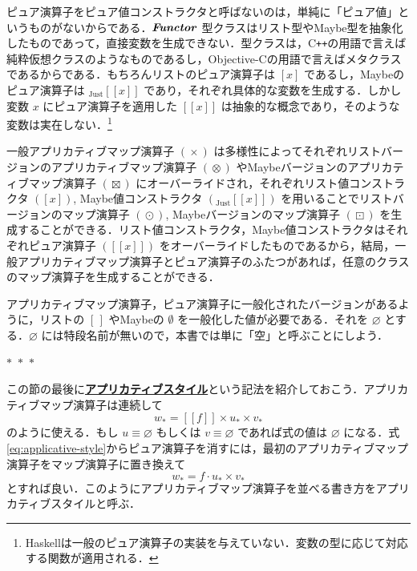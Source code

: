 \documentclass[a5paper,twoside,fleqn,draft]{jsbook}
\def\[{[\![}
\def\]{]\!]}
\newcommand{\separator}{\begin{center}$*$~$*$~$*$\end{center}}
\newcommand{\programminglanguage}[1]{\textsf{#1}}
\newcommand{\cxx}{\programminglanguage{C}\texttt{++}}
\newcommand{\haskell}{\programminglanguage{Haskell}}
\newcommand{\objectivec}{\programminglanguage{Objective-C}}
\newcommand{\keyword}[1]{{\underline{\textbf{#1}}}}
\newcommand{\mEmptyList}{{[\,]}}
\newcommand{\mNothing}{\emptyset}
\newcommand{\mPureNothing}{\varnothing}
\DeclareMathOperator{\mAppMap}{\times}
\DeclareMathOperator{\mAppMapList}{\otimes}
\DeclareMathOperator{\mAppMapMaybe}{\boxtimes}
\DeclareMathOperator{\mMap}{\cdot}
\DeclareMathOperator{\mMapList}{\odot}
\DeclareMathOperator{\mMapMaybe}{\boxdot}
\newcommand{\mValueConstructor}[1]{\mathrm{#1}}
\newcommand{\mValueWith}[2]{{}_\mValueConstructor{#1}\[#2\]}
\newcommand{\mJustWith}[1]{\mValueWith{Just}{#1}}
\newcommand{\mPureWith}[1]{\[#1\]}
\newcommand{\mTypeClass}[1]{\textbf{\textit{#1}}}
\newcommand{\mFunctorTypeClass}{\mTypeClass{Functor}}
\newcommand{\mContainer}[1]{{#1}_*}
\begin{document}
ピュア演算子をピュア値コンストラクタと呼ばないのは，単純に「ピュア値」というものがないからである．$\mFunctorTypeClass$ 型クラスはリスト型やMaybe型を抽象化したものであって，直接変数を生成できない．型クラスは，\cxx の用語で言えば純粋仮想クラスのようなものであるし，\objectivec の用語で言えばメタクラスであるからである．もちろんリストのピュア演算子は $[x]$ であるし，Maybeのピュア演算子は $\mJustWith{x}$ であり，それぞれ具体的な変数を生成する．しかし変数 $x$ にピュア演算子を適用した
$\mPureWith{x}$ は抽象的な概念であり，そのような変数は実在しない．\footnote{\haskell は一般のピュア演算子の実装を与えていない．変数の型に応じて対応する関数が適用される．}

一般アプリカティブマップ演算子 $(\mAppMap)$ は多様性によってそれぞれリストバージョンのアプリカティブマップ演算子 $(\mAppMapList)$ やMaybeバージョンのアプリカティブマップ演算子 $(\mAppMapMaybe)$ にオーバーライドされ，それぞれリスト値コンストラクタ $([x])$, Maybe値コンストラクタ $(\mJustWith{x})$ を用いることでリストバージョンのマップ演算子 $(\mMapList)$, Maybeバージョンのマップ演算子 $(\mMapMaybe)$ を生成することができる．リスト値コンストラクタ，Maybe値コンストラクタはそれぞれピュア演算子 $(\mPureWith{x})$ をオーバーライドしたものであるから，結局，一般アプリカティブマップ演算子とピュア演算子のふたつがあれば，任意のクラスのマップ演算子を生成することができる．

アプリカティブマップ演算子，ピュア演算子に一般化されたバージョンがあるように，リストの $\mEmptyList$ やMaybeの $\mNothing$ を一般化した値が必要である．それを $\mPureNothing$ とする．$\mPureNothing$ には特段名前が無いので，本書では単に「空」と呼ぶことにしよう．

\separator

この節の最後に\keyword{アプリカティブスタイル}という記法を紹介しておこう．アプリカティブマップ演算子は連続して
\begin{equation}
  \label{eq:applicative-style}
  \mContainer{w}
  =\mPureWith{f}\mAppMap\mContainer{u}\mAppMap\mContainer{v}
\end{equation}
のように使える．もし $u\equiv\mPureNothing$ もしくは $v\equiv\mPureNothing$ であれば式の値は $\mPureNothing$ になる．式\eqref{eq:applicative-style}からピュア演算子を消すには，最初のアプリカティブマップ演算子をマップ演算子に置き換えて
\begin{equation}
  \mContainer{w}=f\mMap\mContainer{u}\mAppMap\mContainer{v}
\end{equation}
とすれば良い．このようにアプリカティブマップ演算子を並べる書き方をアプリカティブスタイルと呼ぶ．
\end{document}
